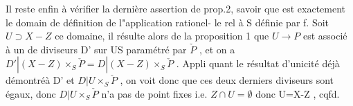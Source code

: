 Il reste enfin à vérifier la dernière assertion de prop.2, savoir
que  est exactement le domain de définition de l"application rationel-%
le rel à S définie par f. Soit $U\supset X-Z$ ce domaine, il résulte alors de
la proposition 1 que $U\longrightarrow P$ est associé à un de diviseurs
D' sur U\unsure{/}S paramétré par $\check{P}$ , et on a $D'|(X-Z)\times_S\check{P} = D|(X-Z)\times_S\check{P}$ . Appli
quant le résultat d'unicité \hand{(}déjà démontré\hand{)}à D' et $D|U\times_S\check{P}$ , on voit donc
que ces deux derniers diviseurs sont égaux, donc $D|U\times_S\check{P}$ n'a pas de
point fixes i.e. $Z\cap U=\emptyset$ donc U=X-Z , cqfd.

